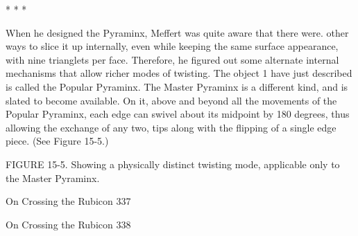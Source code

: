                                        *   *   *

        When he designed the Pyraminx, Meffert was quite aware that there were.
other ways to slice it up internally, even while keeping the same surface appearance,
with nine trianglets per face. Therefore, he figured out some alternate internal
mechanisms that allow richer modes of twisting. The object 1 have just described is
called the Popular Pyraminx. The Master Pyraminx is a different kind, and is slated to
become available. On it, above and beyond all the movements of the Popular
Pyraminx, each edge can swivel about its midpoint by 180 degrees, thus allowing the
exchange of any two, tips along with the flipping of a single edge piece. (See Figure
15-5.)

FIGURE 15-5. Showing a physically distinct twisting mode, applicable only to the
Master Pyraminx.




On Crossing the Rubicon                                                             337

On Crossing the Rubicon   338

